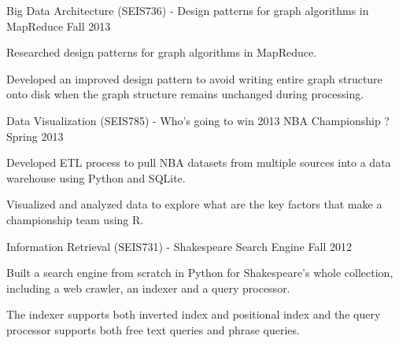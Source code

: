 \begin{cventries}
\end{cventries}


\begin{cventries}

  \cvcoursework
    {Big Data Architecture (SEIS736) - Design patterns for graph algorithms in MapReduce}
    {Fall 2013} %
    {
      \begin{cvitems} %
        \item {Researched design patterns for graph algorithms in MapReduce.}
        \item {Developed an improved design pattern to
    avoid writing entire graph structure onto disk when the graph
    structure remains unchanged during processing.}
      \end{cvitems}
    }

  \cvcoursework
    {Data Visualization (SEIS785) - Who's going to win 2013 NBA
    Championship ?}
    {Spring 2013} %
    {
      \begin{cvitems} %
        \item {Developed ETL process to pull NBA datasets from
    multiple sources into a data warehouse using Python and SQLite.}
        \item {Visualized and analyzed data to explore what are the
    key factors that make a championship team using R.}
      \end{cvitems}
    }

  \cvcoursework
    {Information Retrieval (SEIS731) - Shakespeare Search Engine}
    {Fall 2012} %
    {
      \begin{cvitems} %
        \item {Built a search engine from scratch in Python for
    Shakespeare's whole collection, including a web crawler, an
    indexer and a query processor.} %
    \item {The indexer supports both inverted index and positional
    index and the query processor supports both free text queries and
    phrase queries.}
      \end{cvitems}
    }

\end{cventries}
